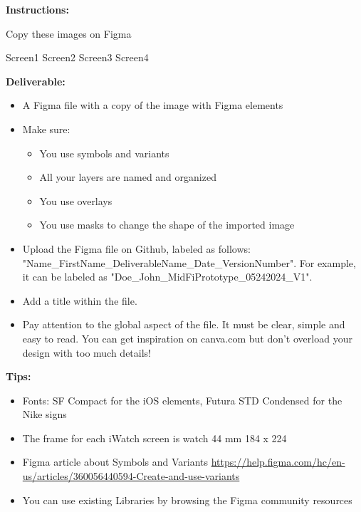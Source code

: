 \makeheaderfiles

\textbf{Instructions:}

Copy these images on Figma

Screen1
Screen2
Screen3
Screen4

\textbf{Deliverable:}

\begin{itemize}
\item A Figma file with a copy of the image with Figma elements
\item Make sure:
\begin{itemize}
\item You use symbols and variants
\item All your layers are named and organized
\item You use overlays
\item You use masks to change the shape of the imported image
\end{itemize}
\item Upload the Figma file on Github, labeled as follows: "Name\_FirstName\_DeliverableName\_Date\_VersionNumber". For example, it can be labeled as "Doe\_John\_MidFiPrototype\_05242024\_V1".
\item Add a title within the file.
\item Pay attention to the global aspect of the file. It must be clear, simple and easy to read. You can get inspiration on canva.com but don't overload your design with too much details!
\end{itemize}

\textbf{Tips:}

\begin{itemize}
\item Fonts: SF Compact for the iOS elements,  Futura STD Condensed for the Nike signs
\item The frame for each iWatch screen is watch 44 mm 184 x 224
\item Figma article about Symbols and Variants \url{https://help.figma.com/hc/en-us/articles/360056440594-Create-and-use-variants}
\item You can use existing Libraries by browsing the Figma community resources
\end{itemize}

